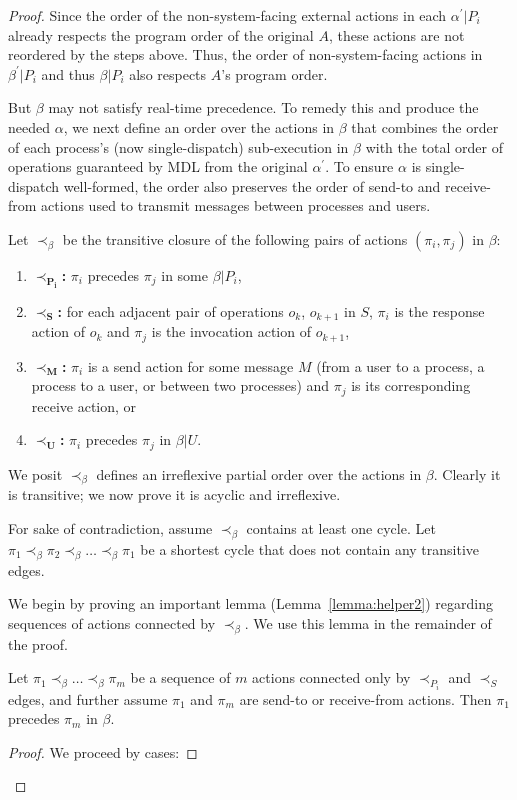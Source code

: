 \begin{proof}
  Since the order of the non-system-facing external actions in each $\alpha^\prime | P_i$ already respects the program order of the original $A$, these actions are not reordered by the steps above. Thus, the order of non-system-facing actions in $\beta^\prime | P_i$ and thus $\beta | P_i$ also respects $A$’s program order. 

  But $\beta$ may not satisfy real-time precedence. To remedy this and produce the needed $\alpha$, we next define an order over the actions in $\beta$ that combines the order of each process’s (now single-dispatch) sub-execution in $\beta$ with the total order of operations guaranteed by MDL from the original $\alpha^\prime$. To ensure $\alpha$ is single-dispatch well-formed, the order also preserves the order of send-to and receive-from actions used to transmit messages between processes and users.

  Let $\prec_\beta$ be the transitive closure of the following pairs of actions $(\pi_i, \pi_j)$ in $\beta$:
  \begin{enumerate}
      \item $\mathbf{\prec_{P_i}}$\textbf{:} $\pi_i$ precedes $\pi_j$ in some $\beta | P_i$,
      \item $\mathbf{\prec_S}$\textbf{:} for each adjacent pair of operations $o_k$, $o_{k+1}$ in $S$, $\pi_i$ is the response action of $o_k$ and $\pi_j$ is the invocation action of $o_{k+1}$,
      \item $\mathbf{\prec_M}$\textbf{:} $\pi_i$ is a send action for some message $M$ (from a user to a process, a process to a user, or between two processes) and $\pi_j$ is its corresponding receive action, or
      \item $\mathbf{\prec_U}$\textbf{:} $\pi_i$ precedes $\pi_j$ in $\beta | U$.
  \end{enumerate}

  We posit $\prec_\beta$ defines an irreflexive partial order over the actions in $\beta$. Clearly it is transitive; we now prove it is acyclic and irreflexive.

  For sake of contradiction, assume $\prec_\beta$ contains at least one cycle. Let $\pi_1 \prec_\beta \pi_2 \prec_\beta \ldots \prec_\beta \pi_1$ be a shortest cycle that does not contain any transitive edges.

  We begin by proving an important lemma (Lemma~\ref{lemma:helper2}) regarding sequences of actions connected by $\prec_\beta$. We use this lemma in the remainder of the proof.

  \begin{lem}
    Let $\pi_1 \prec_\beta \ldots \prec_\beta \pi_m$ be a sequence of $m$ actions connected only by $\prec_{P_i}$ and $\prec_S$ edges, and further assume $\pi_1$ and $\pi_m$ are send-to or receive-from actions. Then $\pi_1$ precedes $\pi_m$ in $\beta$.
    \label{lemma:helper1}
  \end{lem}
  \begin{proof}
      We proceed by cases:


\end{proof}
\end{proof}
